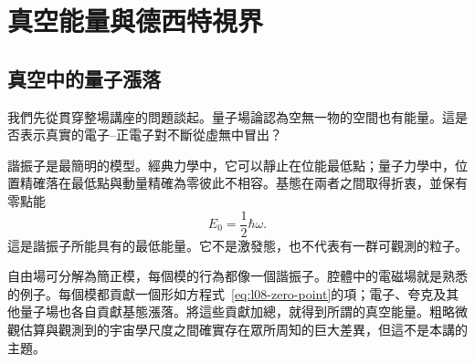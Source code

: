 \chapter{真空能量與德西特視界}


\section{真空中的量子漲落}

我們先從貫穿整場講座的問題談起。量子場論認為空無一物的空間也有能量。這是否表示真實的電子--正電子對不斷從虛無中冒出？

\begin{classroomqa}
\end{classroomqa}

諧振子是最簡明的模型。經典力學中，它可以靜止在位能最低點；量子力學中，位置精確落在最低點與動量精確為零彼此不相容。基態在兩者之間取得折衷，並保有零點能
\begin{equation}
E_0=\frac{1}{2}\hbar\omega.
\label{eq:l08-zero-point}
\end{equation}
這是諧振子所能具有的最低能量。它不是激發態，也不代表有一群可觀測的粒子。

自由場可分解為簡正模，每個模的行為都像一個諧振子。腔體中的電磁場就是熟悉的例子。每個模都貢獻一個形如方程式~\eqref{eq:l08-zero-point}的項；電子、夸克及其他量子場也各自貢獻基態漲落。將這些貢獻加總，就得到所謂的真空能量。粗略微觀估算與觀測到的宇宙學尺度之間確實存在眾所周知的巨大差異，但這不是本講的主題。

\begin{classroomqa}
\end{classroomqa}

\begin{classroomqa}
\end{classroomqa}


